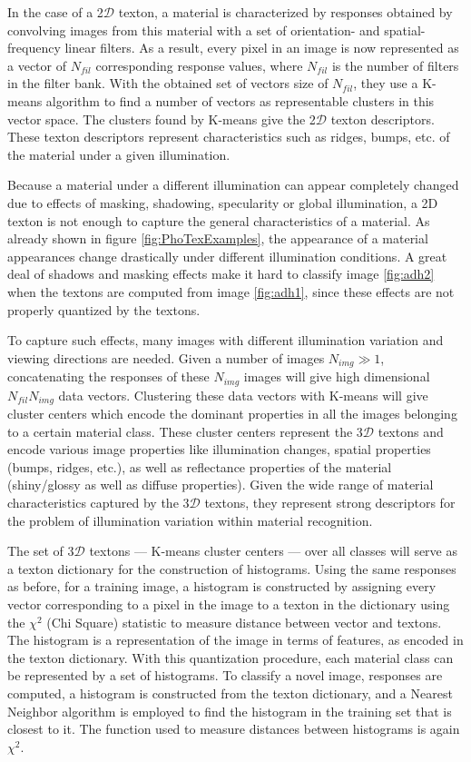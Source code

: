In the case of a 2$\mathcal{D}$ texton, a material is characterized by responses obtained by convolving images from this material with a set of orientation- and spatial-frequency linear filters. As a result, every pixel in an image is now represented as a vector of $N_{fil}$ corresponding response values, where $N_{fil}$ is the number of filters in the filter bank. With the obtained set of vectors size of $N_{fil}$, they use a K-means algorithm  to find a number of vectors as representable clusters in this vector space. The clusters found by K-means give the 2$\mathcal{D}$ texton descriptors. These texton descriptors represent characteristics such as ridges, bumps, etc. of the material under a given illumination.

Because a material under a different illumination can appear completely changed due to effects of masking, shadowing, specularity or global illumination, a 2D texton is not enough to capture the general characteristics of a material. As already shown in figure \ref{fig:PhoTexExamples}, the appearance of a material appearances change drastically under different illumination conditions. A great deal of shadows and masking effects make it hard to classify image \ref{fig:adh2} when the textons are computed from image \ref{fig:adh1}, since these effects are not properly quantized by the textons. 

To capture such effects, many images with different illumination variation and viewing directions are needed. Given a number of images $N_{img} \gg 1$,  concatenating the responses of these $N_{img}$ images will give high dimensional $N_{fil}N_{img}$ data vectors. Clustering these data vectors with K-means will give cluster centers which encode the dominant properties in all the images belonging to a certain material class. These cluster centers represent the 3$\mathcal{D}$ textons and encode various image properties like illumination changes, spatial properties (bumps, ridges, etc.), as well as reflectance properties of the material (shiny/glossy as well as diffuse properties). Given the wide range of material characteristics captured by the 3$\mathcal{D}$ textons, they represent strong descriptors for the problem of illumination variation within material recognition.

The set of 3$\mathcal{D}$ textons --- K-means cluster centers --- over all classes will serve as a texton dictionary for the construction of histograms. Using the same responses as before, for a training image, a histogram is constructed by assigning every vector corresponding to a pixel in the image to a texton in the dictionary using the $\chi^2$ (Chi Square) statistic to measure distance between vector and textons. The histogram is a representation of the image in terms of features, as encoded in the texton dictionary. With this quantization procedure, each material class can be represented by a set of histograms. To classify a novel image, responses are computed, a histogram is constructed from the texton dictionary, and a Nearest Neighbor algorithm  is employed to find the histogram in the training set that is closest to it. The function used to measure distances between histograms is again $\chi^2$.

